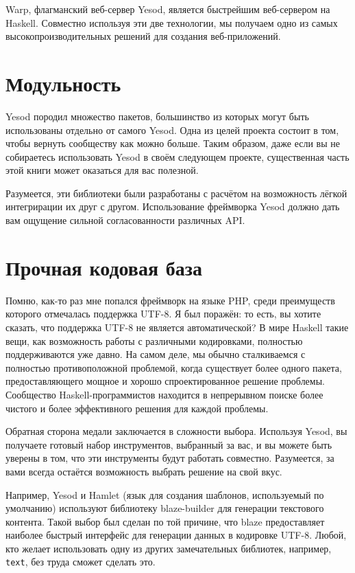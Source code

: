 Warp, флагманский веб-сервер Yesod, является быстрейшим веб-сервером на Haskell. Совместно используя эти две технологии, мы получаем одно из самых высокопроизводительных решений для создания веб-приложений.

\section{Модульность}

Yesod породил множество пакетов, большинство из которых могут быть использованы отдельно от самого Yesod. Одна из целей проекта состоит в том, чтобы вернуть сообществу как можно больше. Таким образом, даже если вы не собираетесь использовать Yesod в своём следующем проекте, существенная часть этой книги может оказаться для вас полезной.

Разумеется, эти библиотеки были разработаны с расчётом на возможность лёгкой интегрирации их друг с другом. Использование фреймворка Yesod должно дать вам ощущение сильной согласованности различных API.

\section{Прочная кодовая база}

Помню, как-то раз мне попался фреймворк на языке PHP, среди преимуществ которого отмечалась поддержка UTF-8. Я был поражён: то есть, вы хотите сказать, что поддержка UTF-8 не является автоматической? В мире Haskell такие вещи, как возможность работы с различными кодировками, полностью поддерживаются уже давно. На самом деле, мы обычно сталкиваемся с полностью противоположной проблемой, когда существует более одного пакета, предоставляющего мощное и хорошо спроектированное решение проблемы. Сообщество Haskell-программистов находится в непрерывном поиске более чистого и более эффективного решения для каждой проблемы.

Обратная сторона медали заключается в сложности выбора. Используя Yesod, вы получаете готовый набор инструментов, выбранный за вас, и вы можете быть уверены в том, что эти инструменты будут работать совместно. Разумеется, за вами всегда остаётся возможность выбрать решение на свой вкус.

Например, Yesod и Hamlet (язык для создания шаблонов, используемый по умолчанию) используют библиотеку blaze-builder для генерации текстового контента. Такой выбор был сделан по той причине, что blaze предоставляет наиболее быстрый интерфейс для генерации данных в кодировке UTF-8. Любой, кто желает использовать одну из других замечательных библиотек, например, \texttt{text}, без труда сможет сделать это.


